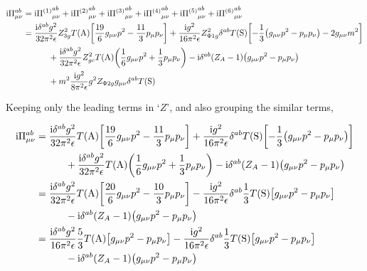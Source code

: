 \begin{align}
    \textnormal{i} \Pi^{ab}_{\mu\nu}&=\textnormal{i} {\Pi^{\qty(1)}}^{ab}_{\mu\nu}+\textnormal{i} {\Pi^{\qty(2)}}^{ab}_{\mu\nu}+\textnormal{i} {\Pi^{\qty(3)}}^{ab}_{\mu\nu}+\textnormal{i} {\Pi^{\qty(4)}}^{ab}_{\mu\nu}+\textnormal{i} {\Pi^{\qty(5)}}^{ab}_{\mu\nu}+\textnormal{i} {\Pi^{\qty(6)}}^{ab}_{\mu\nu}\nonumber\\
    &=\frac{\textnormal{i}\delta^{ab}g^2}{32\pi^2\epsilon}Z_{3g}^2T\qty(\textnormal{A})\qty[\frac{19}{6}g_{\mu\nu}p^2-\frac{11}{3}p_\mu p_\nu]+\frac{\textnormal{i} g^2}{16\pi^2\epsilon}Z^2_{\Phi1g}\delta^{ab}T\qty(\textnormal{S})
    \qty[-\frac13\qty(g_{\mu\nu}p^2-p_\mu p_\nu)-2g_{\mu\nu}m^2]\nonumber\\
    &\quad\quad\quad+\frac{\textnormal{i}\delta^{ab}g^2}{32\pi^2\epsilon}Z_{gc}^2T\qty(\textnormal{A})\qty(\frac{1}{6}g_{\mu\nu}p^2+\frac13p_\mu p_\nu)-\textnormal{i}\delta^{ab}\qty(Z_A-1)\qty(g_{\mu\nu}p^2-p_\mu p_\nu)\nonumber\\
    &\quad\quad\quad+m^2\frac{\textnormal{i} g^2}{8\pi^2\epsilon}g^2Z_{\Phi2g}g_{\mu\nu}
    \delta^{ab}T\qty(\textnormal S)\nonumber
\end{align}

Keeping only the leading terms in `$Z$', and also grouping the similar terms,

\begin{align}
    \textnormal{i} \Pi^{ab}_{\mu\nu}&=\frac{\textnormal{i}\delta^{ab}g^2}{32\pi^2\epsilon}T\qty(\textnormal{A})\qty[\frac{19}{6}g_{\mu\nu}p^2-\frac{11}{3}p_\mu p_\nu]+\frac{\textnormal{i} g^2}{16\pi^2\epsilon}\delta^{ab}T\qty(\textnormal{S})
    \qty[-\frac13\qty(g_{\mu\nu}p^2-p_\mu p_\nu)]\nonumber\\
    &\quad\quad\quad+\frac{\textnormal{i}\delta^{ab}g^2}{32\pi^2\epsilon}T\qty(\textnormal{A})\qty(\frac{1}{6}g_{\mu\nu}p^2+\frac13p_\mu p_\nu)-\textnormal{i}\delta^{ab}\qty(Z_A-1)\qty(g_{\mu\nu}p^2-p_\mu p_\nu)\nonumber\\
    &=\frac{\textnormal{i}\delta^{ab}g^2}{32\pi^2\epsilon}T\qty(\textnormal{A})\qty[\frac{20}{6}g_{\mu\nu}p^2-\frac{10}{3}p_\mu p_\nu]-\frac{\textnormal{i} g^2}{16\pi^2\epsilon}\delta^{ab}\frac13T\qty(\textnormal{S})
    \qty[g_{\mu\nu}p^2-p_\mu p_\nu]\nonumber\\
    &\quad\quad\quad-\textnormal{i}\delta^{ab}\qty(Z_A-1)\qty(g_{\mu\nu}p^2-p_\mu p_\nu)\nonumber\\
    &=\frac{\textnormal{i}\delta^{ab}g^2}{16\pi^2\epsilon}\frac{5}{3}T\qty(\textnormal{A})\qty[g_{\mu\nu}p^2-p_\mu p_\nu]-\frac{\textnormal{i} g^2}{16\pi^2\epsilon}\delta^{ab}\frac13T\qty(\textnormal{S})
    \qty[g_{\mu\nu}p^2-p_\mu p_\nu]\nonumber\\
    &\quad\quad\quad-\textnormal{i}\delta^{ab}\qty(Z_A-1)\qty(g_{\mu\nu}p^2-p_\mu p_\nu)\nonumber
\end{align}


